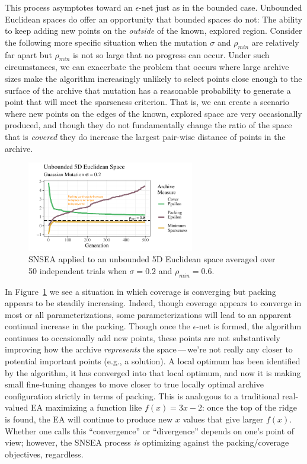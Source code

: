 \documentclass[twoside]{article}
\begin{document}
This process asymptotes toward an $\epsilon$-net just as in the bounded case.  Unbounded Euclidean spaces do offer an opportunity that bounded spaces do not:  The ability to keep adding new points on the \emph{outside} of the known, explored region.  Consider the following more specific situation when the mutation $\sigma$ and $\rho_{min}$ are relatively far apart but $\rho_{min}$ is not so large that no progress can occur. Under such circumstances, we can exacerbate the problem that occurs where large archive sizes make the algorithm increasingly unlikely to select points close enough to the surface of the archive that mutation has a reasonable probability to generate a point that will meet the sparseness criterion.  That is, we can create a scenario where new points on the edges of the known, explored space are very occasionally produced, and though they do not fundamentally change the ratio of the space that is \emph{covered} they do increase the largest pair-wise distance of points in the archive.
%
\begin{figure}[ht]
  \center\includegraphics[width=0.65\textwidth]{Figures/unbounded-s02-r06-NOPOP.pdf}
  \caption{\label{fig:unbounded:nopop:0206} SNSEA applied to an unbounded 5D Euclidean space averaged over 50 independent trials when $\sigma=0.2$ and $\rho_{min}=0.6$.}
\end{figure}

In Figure~\ref{fig:unbounded:nopop:0206} we see a situation in which coverage is converging but packing appears to be steadily increasing.  Indeed, though coverage appears to converge in most or all parameterizations, some parameterizations will lead to an apparent continual increase in the packing.  Though once the $\epsilon$-net is formed, the algorithm continues to occasionally add new points, these points are not substantively improving how the archive \emph{represents} the space\,---\,we're not really any closer to potential important points (e.g., a solution).  A local optimum has been identified by the algorithm, it has converged into that local optimum, and now it is making small fine-tuning changes to move closer to true locally optimal archive configuration strictly in terms of packing. This is analogous to a traditional real-valued EA maximizing a function like $f(x)=3x - 2$: once the top of the ridge is found, the EA will continue to produce new $x$ values that give larger $f(x)$.  Whether one calls this ``convergence'' or ``divergence'' depends on one's point of view; however, the SNSEA process \emph{is} optimizing against the packing/coverage objectives, regardless.
\end{document}

